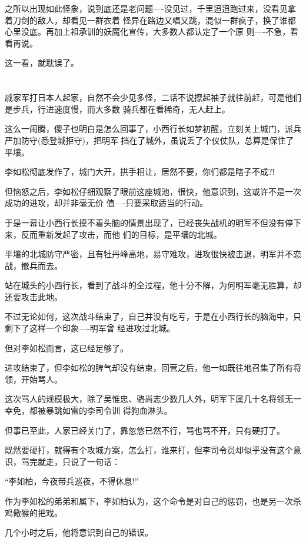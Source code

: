 \documentclass[11pt,a4paper,onecolumn]{article}
\begin{document}
之所以出现如此怪象，说到底还是老问题----没见过，千里迢迢跑过来，没看见拿着刀剑的敌人，却看见一群衣着
怪异在路边又唱又跳，混似一群疯子，换了谁都心里没底。再加上祖承训的妖魔化宣传，大多数人都认定了一个原
则----不急，看看再说。

这一看，就耽误了。

\section[\thesection]{}

戚家军打日本人起家，自然不会少见多怪，二话不说撩起袖子就往前赶，可是他们是步兵，行进速度慢，而大多数
骑兵都在看稀奇，无人赶上。

这么一闹腾，傻子也明白是怎么回事了，小西行长如梦初醒，立刻关上城门，派兵严加防守(悉登城拒守)，把明军
挡在了城外，虽说丢了个仪仗队，总算是保住了平壤。

李如松彻底发作了，城门大开，拱手相让，居然不要，你们都是瞎子不成?!

但恼怒之后，李如松仔细观察了眼前这座城池，很快，他意识到，这或许不是一次成功的进攻，却并非毫无价
值----只要采取适当的行动。

于是一幕让小西行长摸不着头脑的情景出现了，已经丧失战机的明军不但没有停下来，反而重新发起了攻击，而他
们的目标，是平壤的北城。

平壤的北城防守严密，且有牡丹峰高地，易守难攻，进攻很快被击退，明军并不恋战，撤兵而去。

站在城头的小西行长，看到了战斗的全过程，他十分不解，为何明军毫无胜算，却还要攻击此地。

不过无论如何，这次战斗结束了，自己并没有吃亏，于是在小西行长的脑海中，只剩下了这样一个印象----明军曾
经进攻过北城。

但对李如松而言，这已经足够了。

进攻结束了，但李如松的脾气却没有结束，回营之后，他一如既往地召集了所有将领，开始骂人。

这次骂人的规模极大，除了吴惟忠、骆尚志少数几人外，明军下属几十名将领无一幸免，都被暴跳如雷的李司令训
得狗血淋头。

但事已至此，人家已经关门了，靠忽悠已然不行，骂也骂不开，只有硬打了。

既然要硬打，就得有个攻城方案，怎么打，谁来打，但李司令员却似乎没有这个意识，骂完就走，只说了一句话：

``李如柏，今夜带兵巡夜，不得休息!''

作为李如松的弟弟和属下，李如柏认为，这个命令是对自己的惩罚，也是另一次杀鸡儆猴的把戏。

几个小时之后，他将意识到自己的错误。
\end{document}
